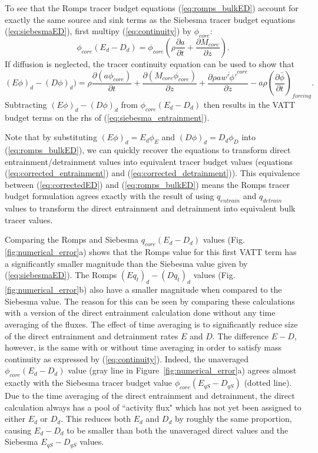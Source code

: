 \documentclass[12pt]{article}
\begin{document}
To see that the Romps tracer budget equations (\ref{eq:romps_bulkED}) account for exactly the same
source and sink terms as  the Siebesma 
tracer budget equations (\ref{eq:siebesmaED}),  first multipy  (\ref{eq:continuity})
by $\phi_{core}$:
\begin{equation}
    \phi_{core}(E_d - D_d) =
    \phi_{core} \left(\rho \frac{\partial a}{\partial t}
                    + \frac{\partial M_{core}}{\partial z}\right).
\end{equation}
If diffusion is neglected, the tracer continuity equation can be 
used to show that
\begin{equation}
    \label{tracer_budget_Ephi_minus_Dphi}
    (E\phi)_d - (D\phi)_d) = 
     \rho \frac{\partial (a \phi_{core})}{\partial t}
   + \frac{\partial (M_{core} \phi_{core})}{\partial z}
   + \frac{\partial \rho a \overline{w' \phi'}^{core}}{\partial z}
   - a \rho \left(\frac{\partial \bar{\phi}}{\partial t}\right)_{forcing}.
\end{equation}
Subtracting $(E\phi)_d - (D\phi)_d$ from $\phi_{core}(E_d - D_d)$ then 
results in the VATT budget terms on the rhs of (\ref{eq:siebesma_entrainment}).  

Note that by substituting $(E \phi)_d = E_d \phi_E$ and 
$(D\phi)_d = D_d \phi_D$ into (\ref{eq:romps_bulkED}), we can quickly recover the 
equations to transform direct entrainment/detrainment values into 
equivalent tracer budget values (equations (\ref{eq:corrected_entrainment}) 
and (\ref{eq:corrected_detrainment})).  This equivalence between 
(\ref{eq:correctedED}) and (\ref{eq:romps_bulkED})
means the Romps tracer budget formulation agrees exactly with the result of 
using $q_{entrain}$ and $q_{detrain}$ values to transform the direct 
entrainment and detrainment into equivalent bulk tracer values.  

Comparing the Romps and Siebesma $q_{core}(E_d - D_d)$ values
(Fig. \ref{fig:numerical_error}a) shows that the Romps value for this
first VATT term has a significantly smaller magnitude than the
Siebesma value given by (\ref{eq:siebesmaED}).  
The Romps $(Eq_t)_d - (Dq_t)_d$ values
(Fig. \ref{fig:numerical_error}b) also have a smaller magnitude when
compared to the Siebesma value.  The reason for this can be seen by
comparing these calculations with a version of the direct entrainment
calculation done without any time averaging of the fluxes.  The effect
of time averaging is to significantly reduce size of the direct
entrainment and detrainment rates $E$ and $D$.  The difference $E-D$,
however, is the same with or without time averaging in order to
satisfy mass continuity as expressed by (\ref{eq:continuity}).
Indeed, the unaveraged $\phi_{core}(E_d - D_d)$ value (gray line in
Figure~\ref{fig:numerical_error}a) agrees almost exactly with the
Siebesma tracer budget value $\phi_{core}(E_{qS} - D_{qS})$ (dotted
line).  Due to the time averaging of the direct entrainment and
detrainment, the direct calculation always has a pool of ``activity
flux" which has not yet been assigned to either $E_d$ or $D_d$.  This
reduces both $E_d$ and $D_d$ by roughly the same proportion, causing
$E_d-D_d$ to be smaller than both the unaveraged direct values and the
Siebesma $E_{qS}-D_{qS}$ values.
\end{document}
